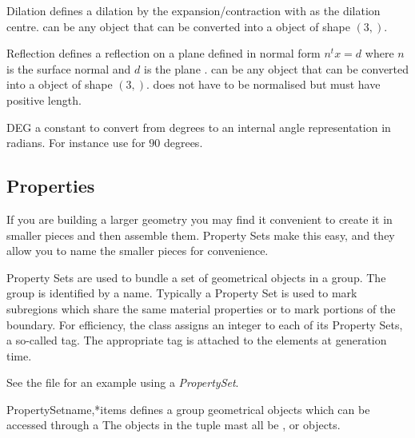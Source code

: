 \begin{classdesc}{Dilation}{}
defines a dilation by the expansion/contraction  with
 as the dilation centre.
 can be any object that can be converted into a \numpy object of
shape $(3,)$.
\end{classdesc}

\begin{classdesc}{Reflection}{}
defines a reflection on a plane defined in normal form $n^t x = d$
where $n$ is the surface normal  and $d$ is the plane .
 can be any object that can be converted into a \numpy object of
shape $(3,)$.
 does not have to be normalised but must have positive length.
\end{classdesc}

\begin{datadesc}{DEG}
a constant to convert from degrees to an internal angle representation in
radians. For instance use  for $90$ degrees.
\end{datadesc}

\subsection{Properties}
If you are building a larger geometry you may find it convenient to
create it in smaller pieces and then assemble them.
Property Sets make this easy, and they allow you to name the smaller
pieces for convenience.

Property Sets are used to bundle a set of geometrical objects in a
group. The group is identified by a name. Typically a Property Set
is used to mark subregions which share the same material properties or
to mark portions of the boundary. For efficiency, the \Design class
assigns an integer to each of its Property Sets, a so-called tag.
The appropriate tag is attached to the elements at generation time.

See the file  for an example using a {\it PropertySet}.

\begin{classdesc}{PropertySet}{name,*items}
defines a group geometrical objects which can be accessed through a 
The objects in the tuple  mast all be \ManifoldOneD, \ManifoldTwoD or \ManifoldThreeD objects.
\end{classdesc}

